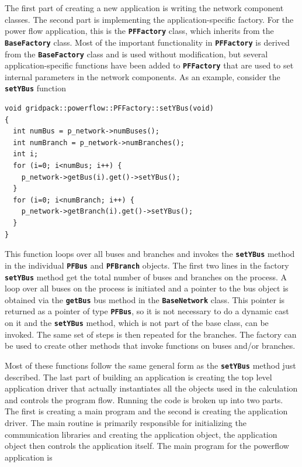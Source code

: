 \documentclass[12pt]{report} %
\begin{document}
The first part of creating a new application is writing the network component classes. The second part is implementing the application-specific factory. For the power flow application, this is the \texttt{\textbf{PFFactory}} class, which inherits from the \texttt{\textbf{BaseFactory}} class. Most of the important functionality in \texttt{\textbf{PFFactory}} is derived from the \texttt{\textbf{BaseFactory}} class and is used without modification, but several application-specific functions have been added to \texttt{\textbf{PFFactory}} that are used to set internal parameters in the network components. As an example, consider the \texttt{\textbf{setYBus}} function

{
\color{red}
\begin{Verbatim}[fontseries=b]
void gridpack::powerflow::PFFactory::setYBus(void)
{
  int numBus = p_network->numBuses();
  int numBranch = p_network->numBranches();
  int i;
  for (i=0; i<numBus; i++) {
    p_network->getBus(i).get()->setYBus();
  }
  for (i=0; i<numBranch; i++) {
    p_network->getBranch(i).get()->setYBus();
  }
}
\end{Verbatim}
}

This function loops over all buses and branches and invokes the \texttt{\textbf{setYBus}} method in the individual \texttt{\textbf{PFBus}} and \texttt{\textbf{PFBranch}} objects. The first two lines in the factory \texttt{\textbf{setYBus}} method get the total number of buses and branches on the process. A loop over all buses on the process is initiated and a pointer to the bus object is obtained via the \texttt{\textbf{getBus}} bus method in the \texttt{\textbf{BaseNetwork}} class. This pointer is returned as a pointer of type \texttt{\textbf{PFBus}}, so it is not necessary to do a dynamic cast on it and the \texttt{\textbf{setYBus}} method, which is not part of the base class, can be invoked. The same set of steps is then repeated for the branches. The factory can be used to create other methods that invoke functions on buses and/or branches. 

Most of these functions follow the same general form as the \texttt{\textbf{setYBus}} method just described.
The last part of building an application is creating the top level application driver that actually instantiates all the objects used in the calculation and controls the program flow. Running the code is broken up into two parts. The first is creating a main program and the second is creating the application driver. The main routine is primarily responsible for initializing the communication libraries and creating the application object, the application object then controls the application itself. The main program for the powerflow application is
\end{document}
